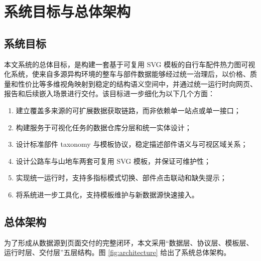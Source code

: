 \documentclass[12pt,hyperref,a4paper,UTF8]{ctexart}
\begin{document}
\section{系统目标与总体架构}

\subsection{系统目标}

本文系统的总体目标，是构建一套基于可复用 SVG 模板的自行车配件热力图可视化系统，使来自多源异构环境的整车与部件数据能够经过统一治理后，以价格、质量和性价比等多维视角映射到稳定的结构语义空间中，并通过统一运行时向网页、报告和后续嵌入场景进行交付。该目标进一步细化为以下几个方面：

\begin{enumerate}
    \item 建立覆盖多来源的可扩展数据获取链路，而非依赖单一站点或单一接口；
    \item 构建服务于可视化任务的数据仓库分层和统一实体设计；
    \item 设计标准部件 taxonomy 与模板协议，稳定描述部件语义与可视区域关系；
    \item 设计公路车与山地车两套可复用 SVG 模板，并保证可维护性；
    \item 实现统一运行时，支持多指标模式切换、部件点击联动和缺失提示；
    \item 将系统进一步工具化，支持模板维护与新数据源快速接入。
\end{enumerate}

\subsection{总体架构}

为了形成从数据源到页面交付的完整闭环，本文采用“数据层、协议层、模板层、运行时层、交付层”五层结构。图 \ref{fig:architecture} 给出了系统总体架构。
\end{document}
